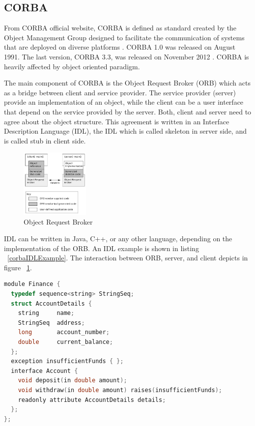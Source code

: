 \documentclass[conference]{IEEEtran}
\begin{document}
\subsection{CORBA}

From CORBA official website, CORBA is defined as standard created by the Object 
Management Group designed to facilitate the communication of systems 
that are deployed on diverse platforms \cite{corba}. CORBA 1.0 was released on August 
1991. The last version, CORBA 3.3, was released on November 2012 \cite{corbaspec}.
CORBA is heavily affected by object oriented paradigm.

The main component of CORBA is the Object Request Broker (ORB) which acts as a bridge 
between client and service provider. The service provider (server) provide an 
implementation of an object, while the client can be a user interface that depend on
the service provided by the server. Both, client and server need to agree about the
object structure. This agreement is written in an Interface Description Language (IDL),
the IDL which is called skeleton in server side, and is called stub in client side.

\begin{figure}
	\centering
	\includegraphics[width=0.3\textwidth]
		{images/Orb.jpg}
	\caption{Object Request Broker}
	\label{fig:orb}
\end{figure}

IDL can be written in Java, C++, or any other language, depending on the implementation of
the ORB. An IDL example is shown in listing ~\ref{corbaIDLExample}. 
The interaction between ORB, server, and client depicts in figure ~\ref{fig:orb}.
 
\begin{lstlisting}[caption=CORBA IDL Example in C++, label=corbaIDLExample, language=c, basicstyle=\small, breaklines=true]
module Finance {
  typedef sequence<string> StringSeq;
  struct AccountDetails {
    string     name;
    StringSeq  address;
    long       account_number;
    double     current_balance;
  };
  exception insufficientFunds { };
  interface Account {
    void deposit(in double amount);
    void withdraw(in double amount) raises(insufficientFunds);
    readonly attribute AccountDetails details;
  };
};
\end{lstlisting}
\end{document}
